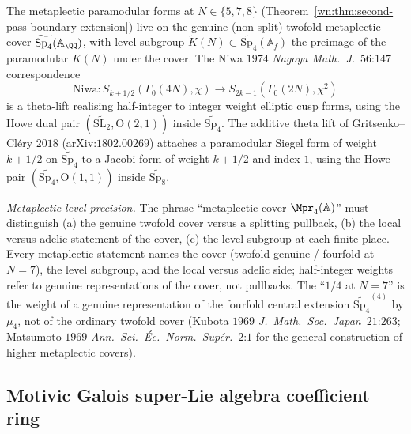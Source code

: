 \begin{theorem}
\label{wn:thm:third-pass-metaplectic-level}

The metaplectic paramodular forms at $N \in \{5, 7, 8\}$
(Theorem~\ref{wn:thm:second-pass-boundary-extension}) live on the
genuine (non-split) twofold metaplectic cover
$\widetilde{\mathrm{Sp}_4}(\mathbb{A}_{\QQ})$, with level subgroup
$\widetilde{K}(N) \subset \widetilde{\mathrm{Sp}_4}(\mathbb{A}_f)$
the preimage of the paramodular $K(N)$ under the cover. The Niwa
$1974$ \emph{Nagoya Math.~J.}~$56$:$147$ correspondence
\[
\mathrm{Niwa}\colon S_{k + 1/2}(\Gamma_0(4N), \chi)
\longrightarrow S_{2k - 1}(\Gamma_0(2N), \chi^2)
\]
is a theta-lift realising half-integer to integer weight elliptic
cusp forms, using the Howe dual pair
$(\widetilde{\mathrm{SL}_2}, \mathrm{O}(2, 1))$ inside
$\widetilde{\mathrm{Sp}_4}$. The additive theta lift of
Gritsenko--Cl\'ery $2018$ (arXiv:$1802.00269$) attaches a paramodular
Siegel form of weight $k + 1/2$ on $\widetilde{\mathrm{Sp}_4}$ to a
Jacobi form of weight $k + 1/2$ and index $1$, using the Howe pair
$(\widetilde{\mathrm{Sp}_4}, \mathrm{O}(1, 1))$ inside
$\widetilde{\mathrm{Sp}_8}$.

\emph{Metaplectic level precision.} The phrase
``metaplectic cover $\Mpr_4(\mathbb{A})$'' must distinguish
(a) the genuine twofold cover versus a splitting pullback,
(b) the local versus adelic statement of the cover, (c) the level
subgroup at each finite place. Every metaplectic statement names the cover
(twofold genuine / fourfold at $N = 7$), the level subgroup, and
the local versus adelic side; half-integer weights refer to genuine
representations of the cover, not pullbacks. The ``$1/4$ at $N = 7$''
is the weight of a genuine representation of the fourfold
central extension $\widetilde{\mathrm{Sp}_4}^{(4)}$ by $\mu_4$, not of
the ordinary twofold cover (Kubota $1969$
\emph{J.~Math.~Soc.~Japan}~$21$:$263$; Matsumoto $1969$
\emph{Ann.~Sci.~\'Ec.~Norm.~Sup\'er.}~$2$:$1$ for the general
construction of higher metaplectic covers).
\end{theorem}

\subsection{Motivic Galois super-Lie algebra coefficient ring}
\label{wn:subsec:third-pass-MGSL}

